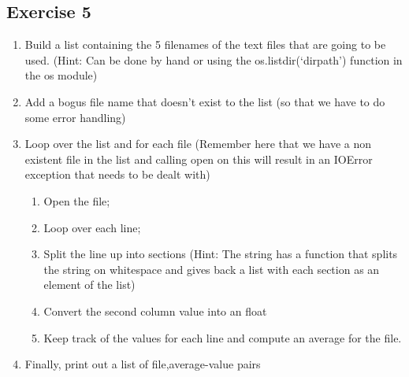 \documentclass[letterpaper,10pt,english,openany]{sphinxmanual}
\begin{document}
\subsection{Exercise 5}
\label{\detokenize{introduction_to_python/solutions_to_exercises:exercise-5}}\begin{enumerate}
\def\theenumi{\arabic{enumi}}
\def\labelenumi{\theenumi .}
\makeatletter\def\p@enumii{\p@enumi \theenumi .}\makeatother
\item {} 
Build a list containing the 5 filenames of the text files that are
going to be used. (Hint: Can be done by hand or using the
os.listdir(‘dirpath’) function in the os module)

\item {} 
Add a bogus file name that doesn’t exist to the list (so that we have
to do some error handling)

\item {} 
Loop over the list and for each file (Remember here that we have a
non existent file in the list and calling open on this will result in
an IOError exception that needs to be dealt with)
\begin{enumerate}
\def\theenumii{\arabic{enumii}}
\def\labelenumii{\theenumii .}
\makeatletter\def\p@enumiii{\p@enumii \theenumii .}\makeatother
\item {} 
Open the file;

\item {} 
Loop over each line;

\item {} 
Split the line up into sections (Hint: The string has a
 function that splits the string on whitespace and
gives back a list with each section as an element of the list)

\item {} 
Convert the second column value into an float

\item {} 
Keep track of the values for each line and compute an average for
the file.

\end{enumerate}

\item {} 
Finally, print out a list of file,average-value pairs

\end{enumerate}
\end{document}
